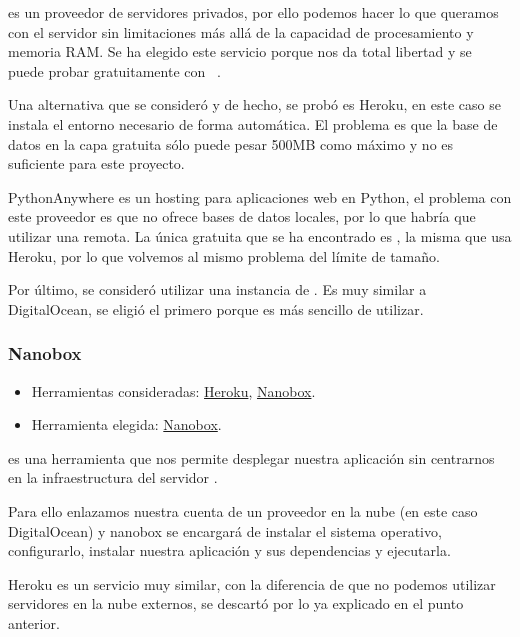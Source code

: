  es un proveedor de servidores privados, por ello podemos hacer lo que queramos con el servidor sin limitaciones más allá de la capacidad de procesamiento y memoria RAM. Se ha elegido este servicio porque nos da total libertad y se puede probar gratuitamente con ~\cite{docs:digitalocean}.

Una alternativa que se consideró y de hecho, se probó es Heroku, en este caso se instala el entorno necesario de forma automática. El problema es que la base de datos en la capa gratuita sólo puede pesar 500MB como máximo y no es suficiente para este proyecto.

PythonAnywhere es un hosting para aplicaciones web en Python, el problema con este proveedor es que no ofrece bases de datos locales, por lo que habría que utilizar una remota. La única gratuita que se ha encontrado es , la misma que usa Heroku, por lo que volvemos al mismo problema del límite de tamaño.

Por último, se consideró utilizar una instancia de . Es muy similar a DigitalOcean, se eligió el primero porque es más sencillo de utilizar.

\subsubsection{Nanobox} \label{nanobox}
\begin{itemize}
	\tightlist
	\item
	Herramientas consideradas:
	\href{https://www.heroku.com/}{Heroku}, 
	\href{https://nanobox.io/}{Nanobox}.
	\item
	Herramienta elegida:
	\href{https://nanobox.io/}{Nanobox}.
\end{itemize}

 es una herramienta que nos permite desplegar nuestra aplicación sin centrarnos en la infraestructura del servidor \cite{docs:nanobox}.

Para ello enlazamos nuestra cuenta de un proveedor en la nube (en este caso DigitalOcean) y nanobox se encargará de instalar el sistema operativo, configurarlo, instalar nuestra aplicación y sus dependencias y ejecutarla.

Heroku es un servicio muy similar, con la diferencia de que no podemos utilizar servidores en la nube externos, se descartó por lo ya explicado en el punto anterior.

